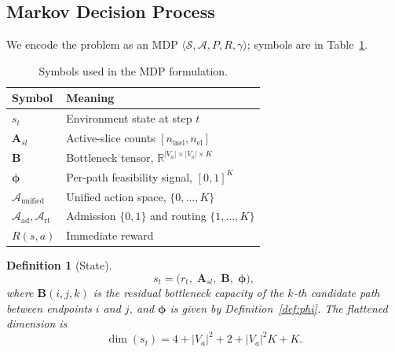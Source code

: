 \documentclass[10pt,journal,comsoc]{IEEEtran}
\newtheorem{definition}{Definition}
\begin{document}
\subsection{Markov Decision Process}
We encode the problem as an MDP $\langle \mathcal{S},\mathcal{A},P,R,\gamma\rangle$;
symbols are in Table~\ref{tab:mdp_symbols}.

\begin{table}[t]
\centering
\caption{Symbols used in the MDP formulation.}
\label{tab:mdp_symbols}
\renewcommand{\arraystretch}{1.15}
\begin{tabular}{>{\raggedright\arraybackslash}p{1.3cm} >{\raggedright\arraybackslash}p{6.6cm}}
\toprule
\textbf{Symbol} & \textbf{Meaning} \\
\midrule
$s_t$ & Environment state at step $t$ \\
$\mathbf{A}_{sl}$ & Active-slice counts $[n_{\text{inel}}, n_{\text{el}}]$ \\
$\mathbf{B}$ & Bottleneck tensor, $\mathbb{R}^{|V_a|\times|V_a|\times K}$ \\
$\boldsymbol{\phi}$ & Per-path feasibility signal, $[0,1]^{K}$ \\
$\mathcal{A}_{\text{unified}}$ & Unified action space, $\{0,\dots,K\}$ \\
$\mathcal{A}_{\text{ad}},\mathcal{A}_{\text{rt}}$ & Admission $\{0,1\}$ and routing $\{1,\dots,K\}$ \\
$R(s,a)$ & Immediate reward \\
\bottomrule
\end{tabular}
\end{table}

\begin{definition}[State]
\label{def:state}
\begin{equation}
s_t = \bigl( r_t,\; \mathbf{A}_{sl},\; \mathbf{B},\; \boldsymbol{\phi} \bigr),
\label{eq:state}
\end{equation}
where $\mathbf{B}(i,j,k)$ is the residual bottleneck capacity of the
$k$-th candidate path between endpoints $i$ and $j$, and
$\boldsymbol{\phi}$ is given by Definition~\ref{def:phi}. The flattened
dimension is
\begin{equation}
\dim(s_t) = 4 + |V_a|^2 + 2 + |V_a|^2 K + K .
\label{eq:statedim}
\end{equation}
\end{definition}
\end{document}
